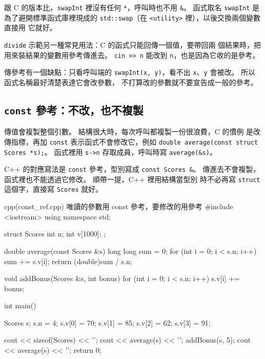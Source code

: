 
跟 C 的版本比，\texttt{swapInt} 裡沒有任何 \texttt{*}，呼叫時也不用
\texttt{\&}。 函式取名 \texttt{swapInt} 是為了避開標準函式庫裡現成的
\texttt{std::swap}（在 \texttt{<utility>} 裡），以後交換兩個變數直接用
它就好。

\texttt{divide} 示範另一種常見用法：C 的函式只能回傳一個值，要帶回兩
個結果時，把用來裝結果的變數用參考傳進去。 \texttt{cin >> n} 能改到
\texttt{n}，也是因為它收的是參考。

傳參考有一個缺點：只看呼叫端的 \texttt{swapInt(x, y)}，看不出
\texttt{x}、\texttt{y} 會被改。 所以函式名稱最好清楚表達它會改參數，
不打算改的參數就不要宣告成一般的參考。

\subsection{\texttt{const} 參考：不改，也不複製}
\label{sec:const-ref}

\begin{crecap}[傳結構的指標]
傳值會複製整個引數。 結構很大時，每次呼叫都複製一份很浪費，C 的慣例
是改傳指標，再加 \texttt{const} 表示函式不會修改它，例如
\texttt{double average(const struct Scores *s);}。 函式裡用 \texttt{s->n} 存取成員，呼叫時寫 \texttt{average(\&s)}。
\end{crecap}

C++ 的對應寫法是 \texttt{const} 參考，型別寫成 \texttt{const Scores \&}。
傳進去不會複製，函式裡也不能透過它修改。 順帶一提，C++ 裡用結構當型別
時不必再寫 \texttt{struct} 這個字，直接寫 \texttt{Scores} 就好。

\begin{example}[label=ex:const-ref]{cpp}{(const\_ref.cpp) 唯讀的參數用 const 參考，要修改的用參考}
#include <iostream>
using namespace std;

struct Scores {
    int n;
    int v[1000];
};

double average(const Scores &s) {
    long long sum = 0;
    for (int i = 0; i < s.n; i++) {
        sum += s.v[i];
    }
    return (double)sum / s.n;
}

void addBonus(Scores &s, int bonus) {
    for (int i = 0; i < s.n; i++) {
        s.v[i] += bonus;
    }
}

int main() {
    Scores s;
    s.n = 4;
    s.v[0] = 70; s.v[1] = 85; s.v[2] = 62; s.v[3] = 91;

    cout << sizeof(Scores) << '\n';
    cout << average(s) << '\n';
    addBonus(s, 5);
    cout << average(s) << '\n';
    return 0;
}
\end{example}

